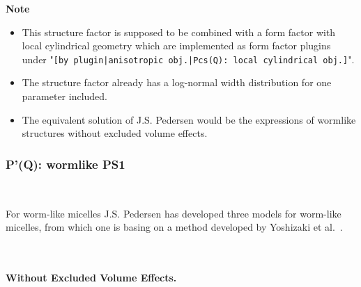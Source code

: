 \noindent
\textbf{Note}
\begin{itemize}
  \item This structure factor is supposed to be combined with a form factor with local cylindrical geometry which are implemented as form factor plugins
under "\texttt{[by plugin|anisotropic obj.|Pcs(Q): local cylindrical obj.]}".
\item The structure factor already has a log-normal width distribution for one parameter included.
\item The equivalent solution of J.S. Pedersen \cite{Pedersen96Macrom} would be the expressions of wormlike structures without excluded volume effects.
\end{itemize}

\clearpage
\subsubsection{P'(Q): wormlike PS1} ~\\
\label{plugin:Pprime4wormPS1}

For worm-like micelles J.S. Pedersen \cite{Pedersen96Macrom} has developed three models
for worm-like micelles, from which one is basing on a method developed by Yoshizaki et al.\ \cite{Yoshizaki1980}.

~\\
\paragraph*{\textbf{Without Excluded Volume Effects.}}~\\

